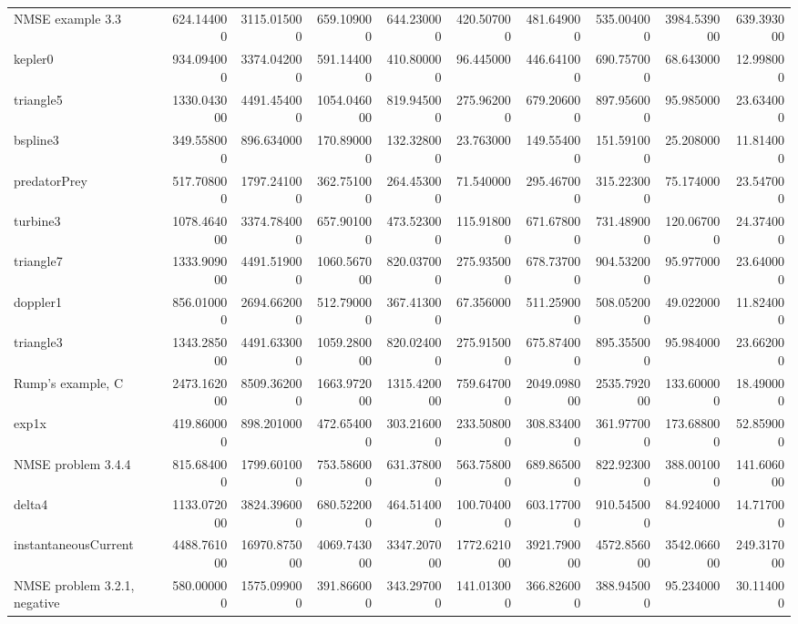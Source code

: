 \begin{longtable}{lrrrrrrrrr}
NMSE example 3.3 & 624.144000 & 3115.015000 & 659.109000 & 644.230000 & 420.507000 & 481.649000 & 535.004000 & 3984.539000 & 639.393000 \\
kepler0 & 934.094000 & 3374.042000 & 591.144000 & 410.800000 & 96.445000 & 446.641000 & 690.757000 & 68.643000 & 12.998000 \\
triangle5 & 1330.043000 & 4491.454000 & 1054.046000 & 819.945000 & 275.962000 & 679.206000 & 897.956000 & 95.985000 & 23.634000 \\
bspline3 & 349.558000 & 896.634000 & 170.890000 & 132.328000 & 23.763000 & 149.554000 & 151.591000 & 25.208000 & 11.814000 \\
predatorPrey & 517.708000 & 1797.241000 & 362.751000 & 264.453000 & 71.540000 & 295.467000 & 315.223000 & 75.174000 & 23.547000 \\
turbine3 & 1078.464000 & 3374.784000 & 657.901000 & 473.523000 & 115.918000 & 671.678000 & 731.489000 & 120.067000 & 24.374000 \\
triangle7 & 1333.909000 & 4491.519000 & 1060.567000 & 820.037000 & 275.935000 & 678.737000 & 904.532000 & 95.977000 & 23.640000 \\
doppler1 & 856.010000 & 2694.662000 & 512.790000 & 367.413000 & 67.356000 & 511.259000 & 508.052000 & 49.022000 & 11.824000 \\
triangle3 & 1343.285000 & 4491.633000 & 1059.280000 & 820.024000 & 275.915000 & 675.874000 & 895.355000 & 95.984000 & 23.662000 \\
Rump's example, C & 2473.162000 & 8509.362000 & 1663.972000 & 1315.420000 & 759.647000 & 2049.098000 & 2535.792000 & 133.600000 & 18.490000 \\
exp1x & 419.860000 & 898.201000 & 472.654000 & 303.216000 & 233.508000 & 308.834000 & 361.977000 & 173.688000 & 52.859000 \\
NMSE problem 3.4.4 & 815.684000 & 1799.601000 & 753.586000 & 631.378000 & 563.758000 & 689.865000 & 822.923000 & 388.001000 & 141.606000 \\
delta4 & 1133.072000 & 3824.396000 & 680.522000 & 464.514000 & 100.704000 & 603.177000 & 910.545000 & 84.924000 & 14.717000 \\
instantaneousCurrent & 4488.761000 & 16970.875000 & 4069.743000 & 3347.207000 & 1772.621000 & 3921.790000 & 4572.856000 & 3542.066000 & 249.317000 \\
NMSE problem 3.2.1, negative & 580.000000 & 1575.099000 & 391.866000 & 343.297000 & 141.013000 & 366.826000 & 388.945000 & 95.234000 & 30.114000 \\

\end{longtable}
